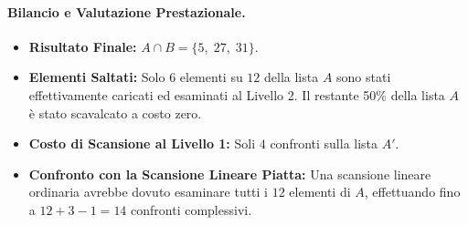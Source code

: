 \paragraph{Bilancio e Valutazione Prestazionale.}
\begin{itemize}
  \item \textbf{Risultato Finale:} $A \cap B = \{5, \; 27, \; 31\}$.
  \item \textbf{Elementi Saltati:} Solo $6$ elementi su $12$ della lista $A$ sono stati effettivamente caricati ed esaminati al Livello 2. Il restante 50\% della lista $A$ \`e stato scavalcato a costo zero.
  \item \textbf{Costo di Scansione al Livello 1:} Soli $4$ confronti sulla lista $A'$.
  \item \textbf{Confronto con la Scansione Lineare Piatta:} Una scansione lineare ordinaria avrebbe dovuto esaminare tutti i $12$ elementi di $A$, effettuando fino a $12 + 3 - 1 = 14$ confronti complessivi.
\end{itemize}


